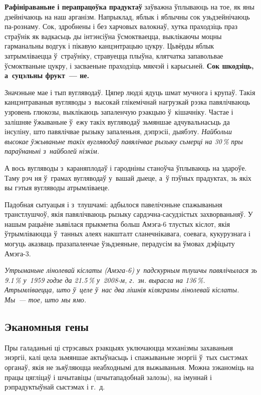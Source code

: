\textbf{Рафініраваньне і перапрацоўка прадуктаў} заўважна ўплываюць на тое, як яны дзейнічаюць на наш арганізм. Напрыклад, яблык і яблычны сок узьдзейнічаюць па-рознаму. Сок, здробнены і без харчовых валокнаў, хутка праходзіць праз страўнік як вадкасьць ды інтэнсіўна ўсмоктваецца, выклікаючы моцны гарманальны водгук і пікавую канцэнтрацыю цукру. Цьвёрды яблык затрымліваецца ў~страўніку, стравуецца плыўна, клятчатка запавольвае ўсмоктваньне цукру, і засваеньне праходзіць мякчэй і карысьней. \textbf{Сок шкодзіць, а~суцэльны фрукт~--- не.}

Значэньне мае і тып вугляводаў. Цяпер людзі ядуць шмат мучнога і крупаў. Такія канцэнтраваныя вугляводы з~высокай глікемічнай нагрузкай рэзка павялічваюць узровень глюкозы, выклікаюць запаленчую рэакцыю ў~кішачніку. Частае і залішняе ўжываньне ў~ежу такіх вугляводаў зьмяншае адчувальнасьць да інсуліну, што павялічвае рызыку запаленьня, дэпрэсіі, дыябэту. \emph{Найбольш высокае ўжываньне такіх вугляводаў павялічвае рызыку сьмерці на 30\,\% пры параўнаньні з~найболей нізкім.}

А вось вугляводы з~караняплодаў і гародніны станоўча ўплываюць на здароўе. Таму рэч ня ў~грамах вугляводаў у~вашай дыеце, а~ў пэўных прадуктах, зь якіх вы гэтыя вугляводы атрымліваеце.

Падобная сытуацыя і з~тлушчамі: адбылося павелічэньне спажываньня транстлушчоў, якія павялічваюць рызыку сардэчна-сасудзістых захворваньняў. У нашым рацыёне зьявілася прыкметна больш Амэга-6 тлустых кіслот, якія ўтрымліваюцца ў~танных алеях накшталт сланечнікавага, соевага, кукурузнага і могуць аказваць празапаленчае ўзьдзеяньне, перадусім ва ўмовах дэфіцыту Амэга-3. 

\emph{Утрыманьне лінолевай кіслаты (Амэга-6) у~падскурным тлушчы павялічылася зь 9.1\,\% у~1959 годзе да 21.5\,\% у~2008-м, г.~зн. вырасла на 136\,\%. Атрымліваецца, што ў~целе ў~нас два лішнія кіляграмы лінолевай кіслаты. Мы~--- тое, што мы ямо.}

\subsection*{Эканомныя гены}

Пры галаданьні ці стрэсавых рэакцыях уключаюцца мэханізмы захаваньня энэргіі, калі цела зьмяншае актыўнасьць і спажываньне энэргіі ў~тых сыстэмах органаў, якія не зьяўляюцца неабходнымі для выжываньня. Можна зэканоміць на працы цягліцаў і шчытавіцы (шчытападобнай залозы), на імуннай і рэпрадуктыўнай сыстэмах і г.~д.

